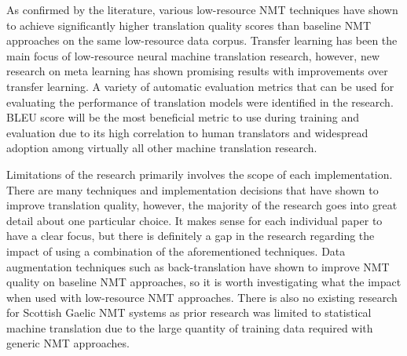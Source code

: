 As confirmed by the literature, various low-resource \acrshort{NMT} techniques have shown to achieve significantly higher translation quality scores than baseline \acrshort{NMT} approaches on the same low-resource data corpus. Transfer learning has been the main focus of low-resource neural machine translation research, however, new research on meta learning has shown promising results with improvements over transfer learning. A variety of automatic evaluation metrics that can be used for evaluating the performance of translation models were identified in the research. \acrshort{BLEU} score will be the most beneficial metric to use during training and evaluation due to its high correlation to human translators and widespread adoption among virtually all other machine translation research.

Limitations of the research primarily involves the scope of each implementation. There are many techniques and implementation decisions that have shown to improve translation quality, however, the majority of the research goes into great detail about one particular choice. It makes sense for each individual paper to have a clear focus, but there is definitely a gap in the research regarding the impact of using a combination of the aforementioned techniques. Data augmentation techniques such as back-translation have shown to improve \acrshort{NMT} quality on baseline \acrshort{NMT} approaches, so it is worth investigating what the impact when used with low-resource \acrshort{NMT} approaches. There is also no existing research for Scottish Gaelic \acrshort{NMT} systems as prior research was limited to statistical machine translation due to the large quantity of training data required with generic \acrshort{NMT} approaches.




